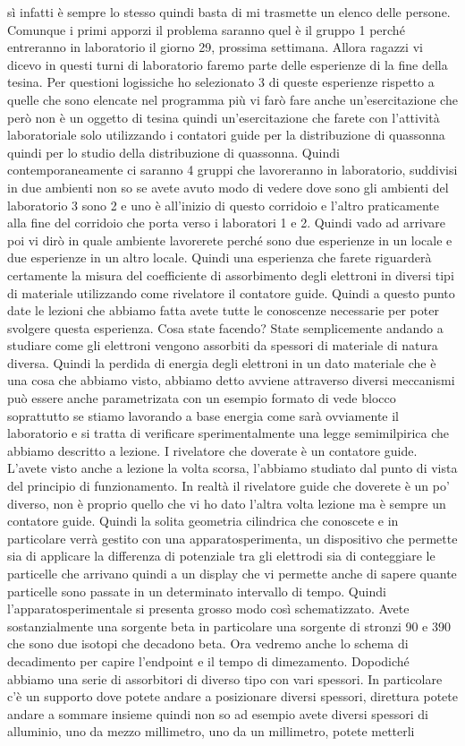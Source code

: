 {sì infatti è sempre lo stesso quindi basta di mi trasmette un elenco delle persone. Comunque i primi apporzi il problema saranno quel è il gruppo 1 perché entreranno in laboratorio il giorno 29, prossima settimana. Allora ragazzi vi dicevo in questi turni di laboratorio faremo parte delle esperienze di la fine della tesina. Per questioni logissiche ho selezionato 3 di queste esperienze rispetto a quelle che sono elencate nel programma più vi farò fare anche un'esercitazione che però non è un oggetto di tesina quindi un'esercitazione che farete con l'attività laboratoriale solo utilizzando i contatori guide per la distribuzione di quassonna quindi per lo studio della distribuzione di quassonna. Quindi contemporaneamente ci saranno 4 gruppi che lavoreranno in laboratorio, suddivisi in due ambienti non so se avete avuto modo di vedere dove sono gli ambienti del laboratorio 3 sono 2 e uno è all'inizio di questo corridoio e l'altro praticamente alla fine del corridoio che porta verso i laboratori 1 e 2. Quindi vado ad arrivare poi vi dirò in quale ambiente lavorerete perché sono due esperienze in un locale e due esperienze in un altro locale. Quindi una esperienza che farete riguarderà certamente la misura del coefficiente di assorbimento degli elettroni in diversi tipi di materiale utilizzando come rivelatore il contatore guide. Quindi a questo punto date le lezioni che abbiamo fatta avete tutte le conoscenze necessarie per poter svolgere questa esperienza. Cosa state facendo? State semplicemente andando a studiare come gli elettroni vengono assorbiti da spessori di materiale di natura diversa. Quindi la perdida di energia degli elettroni in un dato materiale che è una cosa che abbiamo visto, abbiamo detto avviene attraverso diversi meccanismi può essere anche parametrizata con un esempio formato di vede blocco soprattutto se stiamo lavorando a base energia come sarà ovviamente il laboratorio e si tratta di verificare sperimentalmente una legge semimilpirica che abbiamo descritto a lezione. I rivelatore che doverate è un contatore guide. L'avete visto anche a lezione la volta scorsa, l'abbiamo studiato dal punto di vista del principio di funzionamento. In realtà il rivelatore guide che doverete è un po' diverso, non è proprio quello che vi ho dato l'altra volta lezione ma è sempre un contatore guide. Quindi la solita geometria cilindrica che conoscete e in particolare verrà gestito con una apparatosperimenta, un dispositivo che permette sia di applicare la differenza di potenziale tra gli elettrodi sia di conteggiare le particelle che arrivano quindi a un display che vi permette anche di sapere quante particelle sono passate in un determinato intervallo di tempo. Quindi l'apparatosperimentale si presenta grosso modo così schematizzato. Avete sostanzialmente una sorgente beta in particolare una sorgente di stronzi 90 e 390 che sono due isotopi che decadono beta. Ora vedremo anche lo schema di decadimento per capire l'endpoint e il tempo di dimezamento. Dopodiché abbiamo una serie di assorbitori di diverso tipo con vari spessori. In particolare c'è un supporto dove potete andare a posizionare diversi spessori, direttura potete andare a sommare insieme quindi non so ad esempio avete diversi spessori di alluminio, uno da mezzo millimetro, uno da un millimetro, potete metterli }
